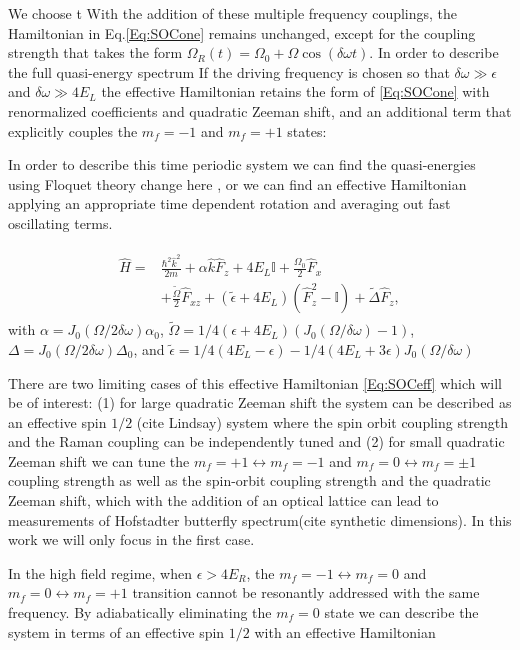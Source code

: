 We choose t
With the addition of these multiple frequency couplings, the Hamiltonian in Eq.\ref{Eq:SOCone} remains unchanged, except for the coupling strength that takes the form $	\Omega_R(t)=\Omega_0 + \Omega\cos(\delta\omega t)$. In order to describe the full quasi-energy spectrum If the driving frequency is chosen so that  $\delta\omega \gg \epsilon$ and $\delta\omega \gg 4E_L$ the effective Hamiltonian retains the form of \ref{Eq:SOCone} with renormalized coefficients and quadratic Zeeman shift, and an additional term that explicitly couples the $m_f=-1$ and $m_f=+1$ states:

In order to describe this time periodic system we can find the quasi-energies using Floquet theory
change here
, or we can find an effective Hamiltonian applying an appropriate time dependent rotation and averaging out fast oscillating terms.


\begin{align}
	\begin{split}
		\hat{H} = &\frac{\hbar^2\hat{k}^2}{2m} + \alpha\hat{k}\hat{F}_z +4E_L\mathbb{I} + \frac{\Omega_0}{2}\hat{F}_x \\
		&+ \frac{\tilde{\Omega}}{2}\hat{F}_{xz} +(\tilde{\epsilon}+4E_L)(\hat{F}_z^2-\mathbb{I}) +\tilde{\Delta}\hat{F}_z, 
		\label{Eq:SOCeff}
	\end{split}
\end{align}	
%
with $\alpha= J_0(\Omega/2\delta\omega)\alpha_0$, $\tilde{\Omega}=1/4(\epsilon+4E_L) (J_0(\Omega/\delta\omega)-1)$, $\Delta=J_0(\Omega/2\delta\omega)\Delta_0$, and $\tilde{\epsilon}= 1/4(4E_L-\epsilon) - 
1/4(4E_L + 3 \epsilon) J_0( \Omega/\delta\omega)$


There are two limiting cases of this effective Hamiltonian \ref{Eq:SOCeff} which will be of interest: (1) for large quadratic Zeeman shift the system can be described as an effective spin $1/2$ (cite Lindsay) system where the spin orbit coupling strength and the Raman coupling can be independently tuned and (2) for small quadratic Zeeman shift we can tune the $m_f=+1\leftrightarrow m_f=-1$ and $m_f=0\leftrightarrow m_f=\pm 1$ coupling strength as well as the spin-orbit coupling strength and the quadratic Zeeman shift, which with the addition of an optical lattice can lead to  measurements of Hofstadter butterfly spectrum(cite synthetic dimensions). In this work we will only focus in the first case. 


In the high field regime, when $\epsilon > 4E_R$, the $m_f=-1\leftrightarrow m_f=0$ and $m_f=0 \leftrightarrow m_f=+1$ transition cannot be resonantly addressed with the same frequency. By adiabatically eliminating the $m_f=0$ state we can describe the system in terms of an effective spin $1/2$  with an effective Hamiltonian

